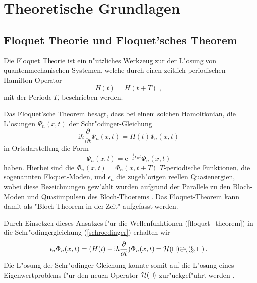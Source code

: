 \chapter{Theoretische Grundlagen}


\section{Floquet Theorie und Floquet'sches Theorem}
  Die Floquet Theorie ist ein n"utzliches Werkzeug zur der L"osung von quantenmechanischen Systemen, welche durch einen zeitlich periodischen Hamilton-Operator
  \begin{equation}
    H(t) = H(t+T) \; ,
  \end{equation}
  mit der Periode $T$, beschrieben werden.

  Das Floquet'sche Theorem besagt, dass bei einem solchen Hamoltionian, die L"osungen $\Psi_n(x,t)$ der Schr"odinger-Gleichung
  \begin{equation}
    \text{i}\hbar\frac{\partial}{\partial t}\Psi_n(x,t) = H(t)\Psi_n(x,t)
    \label{schroedinger}
  \end{equation}
  in Ortsdarstellung die Form
  \begin{equation}
    \Psi_n(x,t) = \text{e}^{-\frac{i}{\hbar}\epsilon_nt}\Phi_n(x,t)
    \label{floquet_theorem}
  \end{equation}
  haben.
  Hierbei sind die $\Phi_n(x,t) = \Phi_n(x,t+T)$ $T$-periodische Funktionen, die sogenannten Floquet-Moden, und $\epsilon_n$ die zugeh"origen reellen Quasienergien, wobei diese Bezeichnungen gew"ahlt wurden aufgrund der Parallele zu den Bloch-Moden und Quasiimpulsen des Bloch-Thoerems \cite{haenlagrangei}.
  Das Floquet-Theorem kann damit als "Bloch-Theorem in der Zeit" aufgefasst werden.

  Durch Einsetzen dieses Ansatzes f"ur die Wellenfunktionen (\ref{floquet_theorem}) in die Schr"odingergleichung (\ref{schroedinger}) erhalten wir
  \begin{equation}
    \epsilon_n \Phi_n(x,t) = (H(t)-\text{i}\hbar\frac{\partial}{\partial t})\Phi_n(x,t) = \cal{H}(t) \Phi_n(x,t) \; .
    \label{eigenwertproblem}
  \end{equation}
  Die L"osung der Schr"odinger Gleichung konnte somit auf die L"osung eines Eigenwertproblems f"ur den neuen Operator $\cal{H}(t)$ zur"uckgef"uhrt werden \cite{sherly}.


